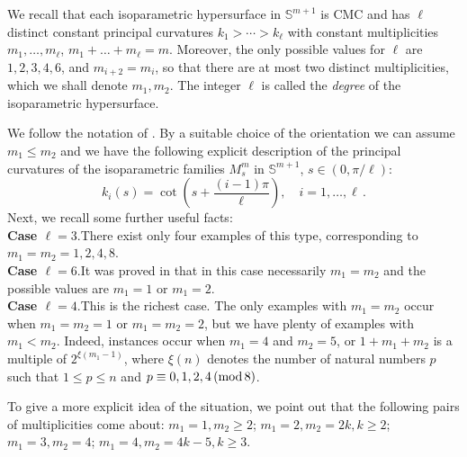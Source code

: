 \documentclass[11pt,leqno]{amsart}
\theoremstyle{plain}
\theoremstyle{definition}
\numberwithin{equation}{section}
\def \s{{\mathbb S}}
\numberwithin{equation}{section}
\begin{document}
{We recall that each isoparametric hypersurface in $\s^{m+1}$ is CMC and has $\ell$ distinct constant principal curvatures $k_1>\cdots >k_\ell$ with constant multiplicities $m_1,\ldots,m_\ell$, $m_1+\ldots +m_\ell=m$. Moreover, the only possible values for $\ell$ are $1,2,3,4,6$, and $m_{i+2}=m_i$, so that there are at most two distinct multiplicities, which we shall denote $m_1,m_2$. The integer $\ell$ is called the \textit{degree} of the isoparametric hypersurface. 

We follow the notation of \cite{MOR-Israel}. By a suitable choice of the orientation we can assume $m_1 \leq m_2$ and we have the following explicit description of the principal curvatures of the isoparametric families $M_{s}^m$ in $\s^{m+1}$, $s \in (0,\pi/\ell)$:
\begin{equation}\label{principal-curvatures}
k_i(s)= \cot \left( s +\frac{(i-1)\pi}{\ell} \right ), \quad i=1,\ldots,\ell\,.
\end{equation}
Next, we recall some further useful facts:\\

\textbf{Case $\ell=3$}.\quad There exist only four examples of this type, corresponding to $m_1=m_2=1,2,4,8$.\\

\textbf{Case $\ell=6$}.\quad It was proved in \cite{MR714104} that in this case necessarily $m_1=m_2$ and the possible values are $m_1=1$ or $m_1=2$. \\

\textbf{Case $\ell=4$}.\quad This is the richest case. The only examples with $m_1=m_2$ occur when $m_1=m_2=1$ or $m_1=m_2=2$, but we have plenty of examples with $m_1< m_2$. Indeed, instances occur when $m_1=4$ and $m_2=5$, or $1+m_1+m_2$ is a multiple of $2^{\xi(m_1-1)}$, where $\xi(n)$ denotes the number of natural numbers $p$ such that $1 \leq p \leq n$ and $p \equiv 0,1,2,4 \,({\rm mod}\, 8)$.


To give a more explicit idea of the situation, we point out that the following pairs of multiplicities come about: $m_1=1,m_2\geq 2$; $m_1=2,m_2=2k,k\geq 2$; $m_1=3,m_2=4$; $m_1=4,m_2=4k-5,k\geq 3$.

\vspace{2mm}

}
\end{document}
